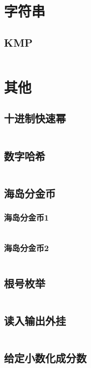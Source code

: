 \documentclass{article}
\begin{document}
\newpage
\section{字符串}
\subsection{KMP}
\inputminted[breaklines]{c++}{../字符串/KMP.cpp}

\newpage
\section{其他}

\subsection{十进制快速幂}
\inputminted[breaklines]{c++}{../其他/十进制快速幂.cpp}

\subsection{数字哈希}
\inputminted[breaklines]{c++}{../其他/数字哈希.cpp}

\subsection{海岛分金币}
\subsubsection{海岛分金币1}
\inputminted[breaklines]{c++}{../其他/海岛分金币1.cpp}

\subsubsection{海岛分金币2}
\inputminted[breaklines]{c++}{../其他/海岛分金币2.cpp}

\subsection{根号枚举}
\inputminted[breaklines]{c++}{../其他/根号枚举.cpp}

\subsection{读入输出外挂}
\inputminted[breaklines]{c++}{../其他/读入输出外挂.cpp}

\subsection{给定小数化成分数}
\inputminted[breaklines]{python}{../其他/给定小数化成分数.py}

\end{document}
